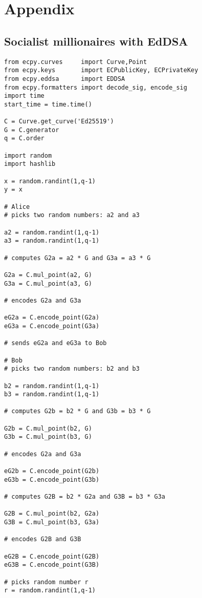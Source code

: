 \chapter*{Appendix}

\section*{Socialist millionaires with EdDSA}

\begin{lstlisting}
from ecpy.curves     import Curve,Point
from ecpy.keys       import ECPublicKey, ECPrivateKey
from ecpy.eddsa      import EDDSA
from ecpy.formatters import decode_sig, encode_sig
import time
start_time = time.time()

C = Curve.get_curve('Ed25519')
G = C.generator
q = C.order

import random
import hashlib

x = random.randint(1,q-1)
y = x

# Alice 
# picks two random numbers: a2 and a3 

a2 = random.randint(1,q-1)
a3 = random.randint(1,q-1)

# computes G2a = a2 * G and G3a = a3 * G 

G2a = C.mul_point(a2, G) 
G3a = C.mul_point(a3, G)

# encodes G2a and G3a

eG2a = C.encode_point(G2a) 
eG3a = C.encode_point(G3a)

# sends eG2a and eG3a to Bob

# Bob 
# picks two random numbers: b2 and b3 

b2 = random.randint(1,q-1)
b3 = random.randint(1,q-1)

# computes G2b = b2 * G and G3b = b3 * G 

G2b = C.mul_point(b2, G)
G3b = C.mul_point(b3, G)

# encodes G2a and G3a

eG2b = C.encode_point(G2b) 
eG3b = C.encode_point(G3b)

# computes G2B = b2 * G2a and G3B = b3 * G3a 

G2B = C.mul_point(b2, G2a) 
G3B = C.mul_point(b3, G3a)

# encodes G2B and G3B

eG2B = C.encode_point(G2B) 
eG3B = C.encode_point(G3B)

# picks random number r 
r = random.randint(1,q-1)


\end{lstlisting}
